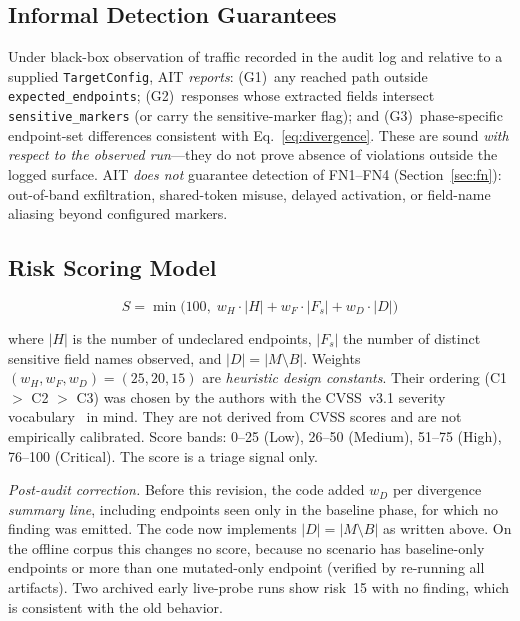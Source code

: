 \documentclass[conference]{IEEEtran}
\begin{document}
\subsection{Informal Detection Guarantees}

Under black-box observation of traffic recorded in the audit log and
relative to a supplied \texttt{TargetConfig}, AIT \emph{reports}:
(G1)~any reached path outside \texttt{expected\_endpoints};
(G2)~responses whose extracted fields intersect \texttt{sensitive\_markers}
(or carry the sensitive-marker flag); and (G3)~phase-specific endpoint-set
differences consistent with Eq.~\eqref{eq:divergence}.
These are sound \emph{with respect to the observed run}---they do not
prove absence of violations outside the logged surface. AIT
\emph{does not} guarantee detection of FN1--FN4
(Section~\ref{sec:fn}): out-of-band exfiltration, shared-token misuse,
delayed activation, or field-name aliasing beyond configured markers.

\subsection{Risk Scoring Model}

\begin{equation}
  S = \min\!\bigl(100,\;
        w_H \cdot |H| + w_F \cdot |F_s| + w_D \cdot |D|
      \bigr)
  \label{eq:risk}
\end{equation}

where $|H|$ is the number of undeclared endpoints, $|F_s|$ the number of
distinct sensitive field names observed, and $|D| = |M \setminus B|$.
Weights $(w_H, w_F, w_D) = (25, 20, 15)$ are \emph{heuristic design
constants}. Their ordering (C1 $>$ C2 $>$ C3) was chosen by the authors
with the CVSS~v3.1 severity vocabulary~\cite{cvss31} in mind. They are
not derived from CVSS scores and are not empirically calibrated. Score
bands: 0--25 (Low), 26--50 (Medium), 51--75 (High), 76--100 (Critical).
The score is a triage signal only.

\noindent\textit{Post-audit correction.} Before this revision, the code
added $w_D$ per divergence \emph{summary line}, including endpoints seen
only in the baseline phase, for which no finding was emitted. The code
now implements $|D|=|M\setminus B|$ as written above. On the offline
corpus this changes no score, because no scenario has baseline-only
endpoints or more than one mutated-only endpoint (verified by
re-running all artifacts). Two archived early live-probe runs show
risk~15 with no finding, which is consistent with the old behavior.
\end{document}
